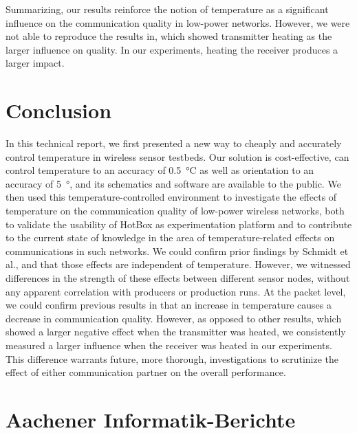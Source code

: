 \documentclass[color]{aib}
\begin{document}
Summarizing, our results reinforce the notion of temperature as a significant influence on the communication quality in low-power networks.
However, we were not able to reproduce the results in\cite{boano13extreme}, which showed transmitter heating as the larger influence on quality.
In our experiments, heating the receiver produces a larger impact.



\section{Conclusion}
In this technical report, we first presented a new way to cheaply and accurately control temperature in wireless sensor testbeds.
Our solution is cost-effective, can control temperature to an accuracy of \SI{0.5}{\celsius} as well as orientation to an accuracy of \SI{5}{\degree}, and its schematics and software are available to the public\cite{hotbox-sources}.
We then used this temperature-controlled environment to investigate the effects of temperature on the communication quality of low-power wireless networks, both to validate the usability of HotBox as experimentation platform and to contribute to the current state of knowledge in the area of temperature-related effects on communications in such networks.
We could confirm prior findings by Schmidt et al.\cite{senserr}, and that those effects are independent of temperature.
However, we witnessed differences in the strength of these effects between different sensor nodes, without any apparent correlation with producers or production runs.
At the packet level, we could confirm previous results in that an increase in temperature causes a decrease in communication quality.
However, as opposed to other results, which showed a larger negative effect when the transmitter was heated\cite{bannister08hot,boano10transaction}, we consistently measured a larger influence when the receiver was heated in our experiments.
This difference warrants future, more thorough, investigations to scrutinize the effect of either communication partner on the overall performance.




\cleardoublepage
\section*{Aachener Informatik-Berichte}
\sss
\end{document}
